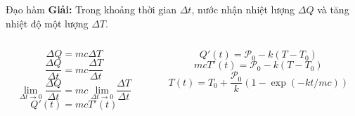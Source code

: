 \begin{frame}{Đạo hàm}
\textbf{Giải:} Trong khoảng thời gian \(\Delta t\), nước nhận nhiệt lượng \(\Delta Q\) và tăng nhiệt độ một lượng \(\Delta T\).
\begin{columns}
    \begin{column}{0.5\textwidth}
\begin{equation}
\Delta Q=mc\Delta T
\end{equation}
\begin{equation}
\dfrac{\Delta Q}{\Delta t}=mc\dfrac{\Delta T}{\Delta t}
\end{equation}
\begin{equation}
\lim_{\Delta t\to 0}\dfrac{\Delta Q}{\Delta t}=mc\lim_{\Delta t\to 0}\dfrac{\Delta T}{\Delta t}
\end{equation}
\begin{equation}
    Q'(t)=mcT'(t)
\end{equation}
    \end{column}
    \begin{column}{0.5\textwidth}
\begin{equation}
Q'(t)=\mathcal{P}_0-k(T-T_0)
\end{equation}
\begin{equation}
mcT'(t)=\mathcal{P}_0-k(T-T_0)
\end{equation}
\begin{equation}
    T(t)=T_0+\dfrac{\mathcal P_0}{k}(1-\exp(-kt/mc))
\end{equation}
    \end{column}
\end{columns}
\end{frame}
